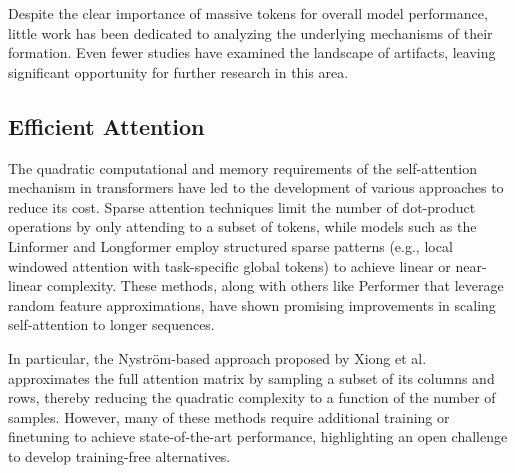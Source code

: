Despite the clear importance of massive tokens for overall model performance, little work has been dedicated to analyzing the underlying mechanisms of their formation. Even fewer studies have examined the landscape of artifacts, leaving significant opportunity for further research in this area. 


\subsection{Efficient Attention}
The quadratic computational and memory requirements of the self-attention mechanism \cite{vaswani2017attention} in transformers have led to the development of various approaches to reduce its cost. Sparse attention techniques \cite{chen2023sparse} \cite{child2019sparseattn} \cite{ren2021combiner} limit the number of dot-product operations by only attending to a subset of tokens, while models such as the Linformer \cite{wang2020linformer} and Longformer \cite{beltagy2020longformer} employ structured sparse patterns (e.g., local windowed attention with task-specific global tokens) to achieve linear or near-linear complexity. These methods, along with others like Performer \cite{choromanski2020performer} that leverage random feature approximations, have shown promising improvements in scaling self-attention to longer sequences. 

In particular, the Nystr\"om-based approach proposed by Xiong et al. \cite{xiong2021nystromformer} approximates the full attention matrix by sampling a subset of its columns and rows, thereby reducing the quadratic complexity to a function of the number of samples. However, many of these methods require additional training or finetuning to achieve state-of-the-art performance, highlighting an open challenge to develop training-free alternatives.
